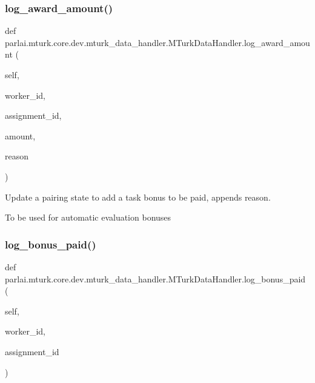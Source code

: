 \subsubsection{\texorpdfstring{log\+\_\+award\+\_\+amount()}{log\_award\_amount()}}
{\footnotesize\ttfamily def parlai.\+mturk.\+core.\+dev.\+mturk\+\_\+data\+\_\+handler.\+M\+Turk\+Data\+Handler.\+log\+\_\+award\+\_\+amount (\begin{DoxyParamCaption}\item[{}]{self,  }\item[{}]{worker\+\_\+id,  }\item[{}]{assignment\+\_\+id,  }\item[{}]{amount,  }\item[{}]{reason }\end{DoxyParamCaption})}

\begin{DoxyVerb}Update a pairing state to add a task bonus to be paid, appends reason.

To be used for automatic evaluation bonuses
\end{DoxyVerb}
 \mbox{\label{classparlai_1_1mturk_1_1core_1_1dev_1_1mturk__data__handler_1_1MTurkDataHandler_aaa2ae4ebfd4b668bdef7642cdf4d9392}} 
\subsubsection{\texorpdfstring{log\+\_\+bonus\+\_\+paid()}{log\_bonus\_paid()}}
{\footnotesize\ttfamily def parlai.\+mturk.\+core.\+dev.\+mturk\+\_\+data\+\_\+handler.\+M\+Turk\+Data\+Handler.\+log\+\_\+bonus\+\_\+paid (\begin{DoxyParamCaption}\item[{}]{self,  }\item[{}]{worker\+\_\+id,  }\item[{}]{assignment\+\_\+id }\end{DoxyParamCaption})}

